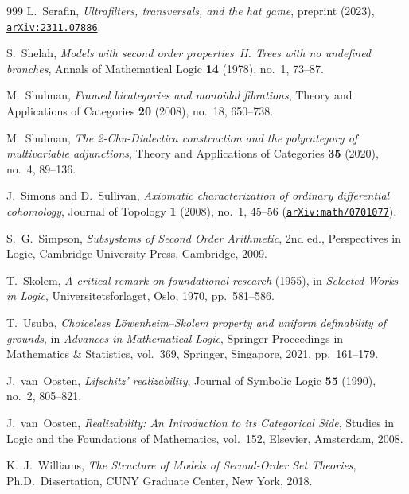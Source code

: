 \documentclass[10pt,twoside,openright]{book}
\theoremstyle{crmplain}
\theoremstyle{crmdef}
\theoremstyle{crmremark}
\begin{document}
\begin{thebibliography}{999}
L.~Serafin,
\emph{Ultrafilters, transversals, and the hat game},
preprint (2023), \href{https://arxiv.org/abs/2311.07886}{\texttt{arXiv:2311.07886}}.

S.~Shelah,
\emph{Models with second order properties~II. Trees with no undefined branches},
Annals of Mathematical Logic \textbf{14} (1978), no.~1, 73--87.

M.~Shulman,
\emph{Framed bicategories and monoidal fibrations},
Theory and Applications of Categories \textbf{20} (2008), no.~18, 650--738.

M.~Shulman,
\emph{The 2-Chu-Dialectica construction and the polycategory of multivariable adjunctions},
Theory and Applications of Categories \textbf{35} (2020), no.~4, 89--136.

J.~Simons and D.~Sullivan,
\emph{Axiomatic characterization of ordinary differential cohomology},
Journal of Topology \textbf{1} (2008), no.~1, 45--56 (\href{https://arxiv.org/abs/math/0701077}{\texttt{arXiv:math/0701077}}).

S.~G.~Simpson,
\emph{Subsystems of Second Order Arithmetic},
2nd ed., Perspectives in Logic, Cambridge University Press, Cambridge, 2009.

T.~Skolem,
\emph{A critical remark on foundational research} (1955),
in \emph{Selected Works in Logic}, Universitetsforlaget, Oslo, 1970, pp.~581--586.

T.~Usuba,
\emph{Choiceless L\"owenheim--Skolem property and uniform definability of grounds},
in \emph{Advances in Mathematical Logic}, Springer Proceedings in Mathematics \& Statistics, vol.~369, Springer, Singapore, 2021, pp.~161--179.

J.~van~Oosten,
\emph{Lifschitz' realizability},
Journal of Symbolic Logic \textbf{55} (1990), no.~2, 805--821.

J.~van~Oosten,
\emph{Realizability: An Introduction to its Categorical Side},
Studies in Logic and the Foundations of Mathematics, vol.~152, Elsevier, Amsterdam, 2008.

K.~J.~Williams,
\emph{The Structure of Models of Second-Order Set Theories},
Ph.D.\ Dissertation, CUNY Graduate Center, New York, 2018.

\end{thebibliography}

\printindex
\end{document}
